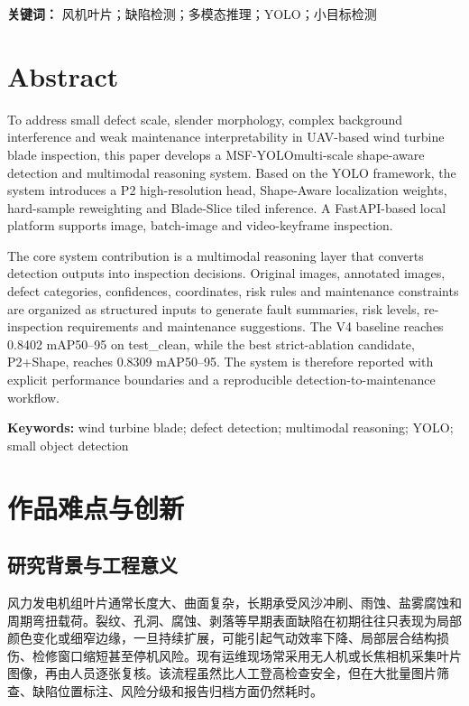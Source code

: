 \documentclass[UTF8,zihao=-4,a4paper]{ctexrep}
\newcommand{\method}{MSF-YOLO}
\begin{document}
\noindent\textbf{关键词：} 风机叶片；缺陷检测；多模态推理；YOLO；小目标检测

\clearpage
\chapter*{Abstract}
To address small defect scale, slender morphology, complex background interference and weak maintenance interpretability in UAV-based wind turbine blade inspection, this paper develops a \method multi-scale shape-aware detection and multimodal reasoning system. Based on the YOLO framework, the system introduces a P2 high-resolution head, Shape-Aware localization weights, hard-sample reweighting and Blade-Slice tiled inference. A FastAPI-based local platform supports image, batch-image and video-keyframe inspection.

The core system contribution is a multimodal reasoning layer that converts detection outputs into inspection decisions. Original images, annotated images, defect categories, confidences, coordinates, risk rules and maintenance constraints are organized as structured inputs to generate fault summaries, risk levels, re-inspection requirements and maintenance suggestions. The V4 baseline reaches 0.8402 mAP50--95 on test\_clean, while the best strict-ablation candidate, P2+Shape, reaches 0.8309 mAP50--95. The system is therefore reported with explicit performance boundaries and a reproducible detection-to-maintenance workflow.

\noindent\textbf{Keywords:} wind turbine blade; defect detection; multimodal reasoning; YOLO; small object detection

\clearpage
\tableofcontents
\clearpage
{}
\setcounter{page}{1}

\chapter{作品难点与创新}

\section{研究背景与工程意义}
风力发电机组叶片通常长度大、曲面复杂，长期承受风沙冲刷、雨蚀、盐雾腐蚀和周期弯扭载荷。裂纹、孔洞、腐蚀、剥落等早期表面缺陷在初期往往只表现为局部颜色变化或细窄边缘，一旦持续扩展，可能引起气动效率下降、局部层合结构损伤、检修窗口缩短甚至停机风险。现有运维现场常采用无人机或长焦相机采集叶片图像，再由人员逐张复核。该流程虽然比人工登高检查安全，但在大批量图片筛查、缺陷位置标注、风险分级和报告归档方面仍然耗时。
\end{document}
